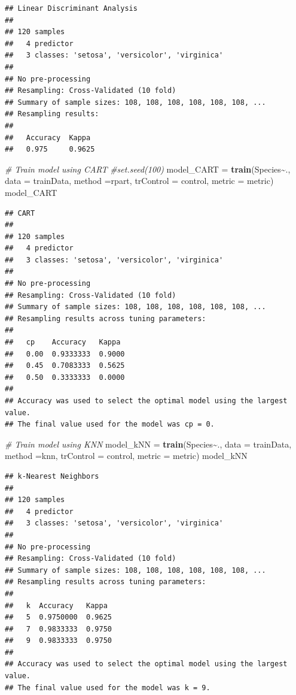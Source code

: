 \documentclass[
]{article}
\newenvironment{Shaded}{\begin{snugshade}}{\end{snugshade}}
\newcommand{\AttributeTok}[1]{\textcolor[rgb]{0.13,0.29,0.53}{#1}}
\newcommand{\CommentTok}[1]{\textcolor[rgb]{0.56,0.35,0.01}{\textit{#1}}}
\newcommand{\FunctionTok}[1]{\textcolor[rgb]{0.13,0.29,0.53}{\textbf{#1}}}
\newcommand{\NormalTok}[1]{#1}
\newcommand{\OtherTok}[1]{\textcolor[rgb]{0.56,0.35,0.01}{#1}}
\newcommand{\SpecialCharTok}[1]{\textcolor[rgb]{0.81,0.36,0.00}{\textbf{#1}}}
\newcommand{\StringTok}[1]{\textcolor[rgb]{0.31,0.60,0.02}{#1}}
\begin{document}
\begin{verbatim}
## Linear Discriminant Analysis 
## 
## 120 samples
##   4 predictor
##   3 classes: 'setosa', 'versicolor', 'virginica' 
## 
## No pre-processing
## Resampling: Cross-Validated (10 fold) 
## Summary of sample sizes: 108, 108, 108, 108, 108, 108, ... 
## Resampling results:
## 
##   Accuracy  Kappa 
##   0.975     0.9625
\end{verbatim}

\begin{Shaded}
\begin{Highlighting}[]
\CommentTok{\# Train model using CART}
\CommentTok{\#set.seed(100)}
\NormalTok{model\_CART }\OtherTok{=} \FunctionTok{train}\NormalTok{(Species}\SpecialCharTok{\textasciitilde{}}\NormalTok{., }\AttributeTok{data =}\NormalTok{ trainData, }\AttributeTok{method =}\StringTok{\textquotesingle{}rpart\textquotesingle{}}\NormalTok{, }\AttributeTok{trControl =}\NormalTok{ control, }\AttributeTok{metric =}\NormalTok{ metric)}
\NormalTok{model\_CART}
\end{Highlighting}
\end{Shaded}

\begin{verbatim}
## CART 
## 
## 120 samples
##   4 predictor
##   3 classes: 'setosa', 'versicolor', 'virginica' 
## 
## No pre-processing
## Resampling: Cross-Validated (10 fold) 
## Summary of sample sizes: 108, 108, 108, 108, 108, 108, ... 
## Resampling results across tuning parameters:
## 
##   cp    Accuracy   Kappa 
##   0.00  0.9333333  0.9000
##   0.45  0.7083333  0.5625
##   0.50  0.3333333  0.0000
## 
## Accuracy was used to select the optimal model using the largest value.
## The final value used for the model was cp = 0.
\end{verbatim}

\begin{Shaded}
\begin{Highlighting}[]
\CommentTok{\# Train model using KNN}
\NormalTok{model\_kNN }\OtherTok{=} \FunctionTok{train}\NormalTok{(Species}\SpecialCharTok{\textasciitilde{}}\NormalTok{., }\AttributeTok{data =}\NormalTok{ trainData, }\AttributeTok{method =}\StringTok{\textquotesingle{}knn\textquotesingle{}}\NormalTok{, }\AttributeTok{trControl =}\NormalTok{ control, }\AttributeTok{metric =}\NormalTok{ metric)}
\NormalTok{model\_kNN}
\end{Highlighting}
\end{Shaded}

\begin{verbatim}
## k-Nearest Neighbors 
## 
## 120 samples
##   4 predictor
##   3 classes: 'setosa', 'versicolor', 'virginica' 
## 
## No pre-processing
## Resampling: Cross-Validated (10 fold) 
## Summary of sample sizes: 108, 108, 108, 108, 108, 108, ... 
## Resampling results across tuning parameters:
## 
##   k  Accuracy   Kappa 
##   5  0.9750000  0.9625
##   7  0.9833333  0.9750
##   9  0.9833333  0.9750
## 
## Accuracy was used to select the optimal model using the largest value.
## The final value used for the model was k = 9.
\end{verbatim}
\end{document}
